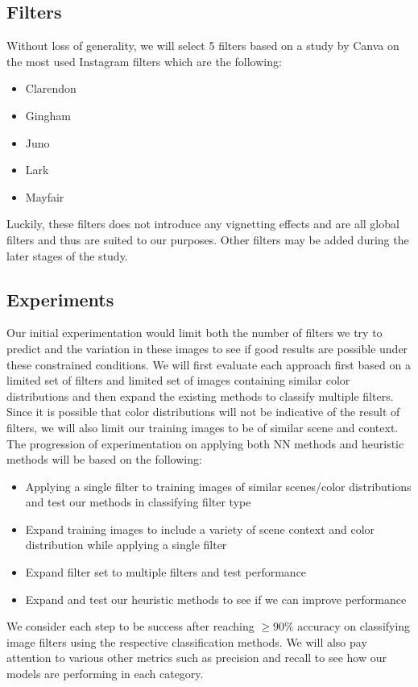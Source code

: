 \documentclass[a4paper, 11pt]{article}
\begin{document}
\subsection*{Filters}
Without loss of generality, we will select 5 filters based on a study by Canva on the most used Instagram filters \cite{Canva} which are the following:
\begin{itemize}
    \item Clarendon
    \item Gingham
    \item Juno
    \item Lark
    \item Mayfair
\end{itemize}
Luckily, these filters does not introduce any vignetting effects and are all global filters and thus are suited to our purposes. Other filters may be added during the later stages of the study.

\subsection*{Experiments}
Our initial experimentation would limit both the number of filters we try to predict and the variation in these images to see if good results are possible under these constrained conditions. We will first evaluate each approach first based on a limited set of filters and limited set of images containing similar color distributions and then expand the existing methods to classify multiple filters. Since it is possible that color distributions will not be indicative of the result of filters, we will also limit our training images to be of similar scene and context. The progression of experimentation on applying both NN methods and heuristic methods will be based on the following:
\begin{itemize}
    \item Applying a single filter to training images of similar scenes/color distributions and test our methods in classifying filter type
    \item Expand training images to include a variety of scene context and color distribution while applying a single filter
    \item Expand filter set to multiple filters and test performance
    \item Expand and test our heuristic methods to see if we can improve performance
\end{itemize}

We consider each step to be success after reaching $\geq 90\%$ accuracy on classifying image filters using the respective classification methods. We will also pay attention to various other metrics such as precision and recall to see how our models are performing in each category.
\end{document}
